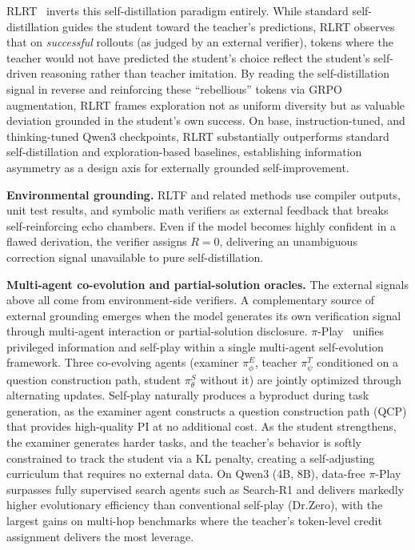 \documentclass{article} %
\begin{document}
RLRT~\citep{kim2026rlrt} inverts this self-distillation paradigm entirely. While standard self-distillation guides the student toward the teacher's predictions, RLRT observes that on \emph{successful} rollouts (as judged by an external verifier), tokens where the teacher would not have predicted the student's choice reflect the student's self-driven reasoning rather than teacher imitation. By reading the self-distillation signal in reverse and reinforcing these ``rebellious'' tokens via GRPO augmentation, RLRT frames exploration not as uniform diversity but as valuable deviation grounded in the student's own success. On base, instruction-tuned, and thinking-tuned Qwen3 checkpoints, RLRT substantially outperforms standard self-distillation and exploration-based baselines, establishing information asymmetry as a design axis for externally grounded self-improvement.

\textbf{Environmental grounding.} RLTF and related methods use compiler outputs, unit test results, and symbolic math verifiers as external feedback that breaks self-reinforcing echo chambers. Even if the model becomes highly confident in a flawed derivation, the verifier assigns $R=0$, delivering an unambiguous correction signal unavailable to pure self-distillation.

\textbf{Multi-agent co-evolution and partial-solution oracles.} The external signals above all come from environment-side verifiers. A complementary source of external grounding emerges when the model generates its own verification signal through multi-agent interaction or partial-solution disclosure. $\pi$-Play~\citep{zhang2026piplay} unifies privileged information and self-play within a single multi-agent self-evolution framework. Three co-evolving agents (examiner $\pi^E_\phi$, teacher $\pi^T_\psi$ conditioned on a question construction path, student $\pi^S_\theta$ without it) are jointly optimized through alternating updates. Self-play naturally produces a byproduct during task generation, as the examiner agent constructs a question construction path (QCP) that provides high-quality PI at no additional cost. As the student strengthens, the examiner generates harder tasks, and the teacher's behavior is softly constrained to track the student via a KL penalty, creating a self-adjusting curriculum that requires no external data. On Qwen3 (4B, 8B), data-free $\pi$-Play surpasses fully supervised search agents such as Search-R1 and delivers markedly higher evolutionary efficiency than conventional self-play (Dr.Zero), with the largest gains on multi-hop benchmarks where the teacher's token-level credit assignment delivers the most leverage.
\end{document}
